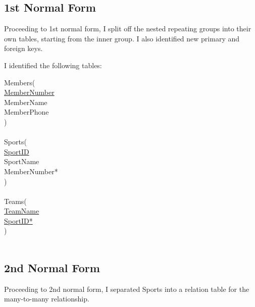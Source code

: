 \documentclass[11pt, article]{article}
\begin{document}
\newpage

\subsection{1st Normal Form}

Proceeding to 1st normal form, I split off the nested repeating groups into their own tables, starting from the inner group. I also identified new primary and foreign keys. 

I identified the following tables:

\begin{tabbing}
Members( \newline \\
	\hspace{5mm}  \underline{MemberNumber}\\
	\hspace{5mm} MemberName                 \\
	\hspace{5mm} MemberPhone                \\
)\\
\\
Sports(\\
	\hspace{5mm}  \underline{SportID}\\
	\hspace{5mm} SportName\\
	\hspace{5mm}  MemberNumber*\\
)\\
\\
	
Teams( \newline \\
	\hspace{5mm}  \underline{TeamName}\\
	\hspace{5mm} \underline{SportID*}\\
)\\
\\


\end{tabbing}
\newpage
\subsection{2nd Normal Form}

Proceeding to 2nd normal form, I separated Sports into a relation table for the many-to-many relationship.
\end{document}
